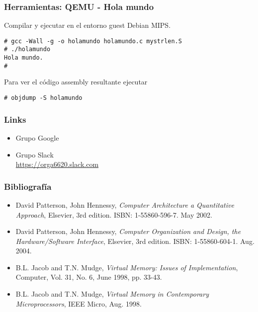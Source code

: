 \documentclass{beamer}
\begin{document}
  \begin{frame}[fragile]
 \frametitle{Herramientas: QEMU - Hola mundo} 
Compilar y ejecutar en el entorno guest Debian MIPS.

\begin{lstlisting}
# gcc -Wall -g -o holamundo holamundo.c mystrlen.S 
# ./holamundo 
Hola mundo.
# 
\end{lstlisting}

Para ver el código assembly resultante ejecutar


\begin{lstlisting}
# objdump -S holamundo
\end{lstlisting}

\end{frame}

\begin{frame}
 \frametitle{Links}
 \begin{itemize}
\item Grupo Google
\item Grupo Slack \\ \url{https://orga6620.slack.com}
 \end{itemize}
 \end{frame}

\begin{frame}
 \frametitle{Bibliografía}
 \begin{itemize}

\item David Patterson, John Hennessy, \textit{Computer Architecture a Quantitative Approach}, Elsevier, 3rd edition. ISBN: 1-55860-596-7. May 2002.  
  
\item David Patterson, John Hennessy, \textit{Computer Organization and Design, the Hardware/Software Interface},  Elsevier, 3rd edition. ISBN: 1-55860-604-1. Aug. 2004. 
    
\item B.L. Jacob and T.N. Mudge, \textit{Virtual Memory: Issues of Implementation}, Computer, Vol. 31, No. 6, June 1998, pp. 33-43.

\item B.L. Jacob and T.N. Mudge, \textit{Virtual Memory in Contemporary Microprocessors}, IEEE Micro, Aug. 1998.
\end{itemize}

\end{frame}
    
\end{document}
